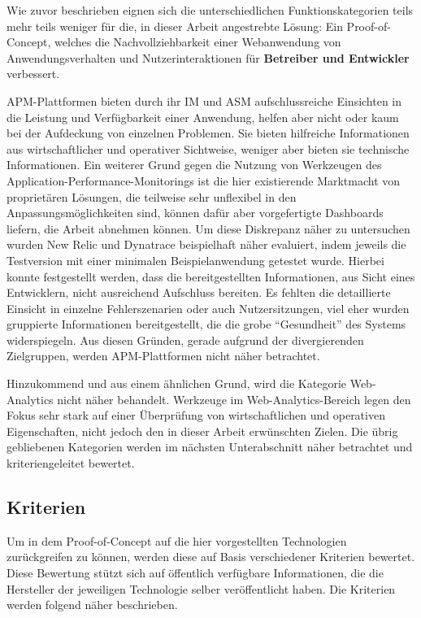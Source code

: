 Wie zuvor beschrieben eignen sich die unterschiedlichen Funktionskategorien teils mehr teils weniger für die, in dieser Arbeit angestrebte Lösung: Ein Proof-of-Concept, welches die Nachvollziehbarkeit einer Webanwendung von Anwendungsverhalten und Nutzerinteraktionen für \textbf{Betreiber und Entwickler} verbessert.

APM-Plattformen bieten durch ihr IM und ASM aufschlussreiche Einsichten in die Leistung und Verfügbarkeit einer Anwendung, helfen aber nicht oder kaum bei der Aufdeckung von einzelnen Problemen. Sie bieten hilfreiche Informationen aus wirtschaftlicher und operativer Sichtweise, weniger aber bieten sie technische Informationen. Ein weiterer Grund gegen die Nutzung von Werkzeugen des Application-Performance-Monitorings ist die hier existierende Marktmacht von proprietären Lösungen, die teilweise sehr unflexibel in den Anpassungsmöglichkeiten sind, können dafür aber vorgefertigte Dashboards liefern, die Arbeit abnehmen können. Um diese Diskrepanz näher zu untersuchen wurden New Relic und Dynatrace beispielhaft näher evaluiert, indem jeweils die Testversion mit einer minimalen Beispielanwendung getestet wurde. Hierbei konnte festgestellt werden, dass die bereitgestellten Informationen, aus Sicht eines Entwicklern, nicht ausreichend Aufschluss bereiten. Es fehlten die detaillierte Einsicht in einzelne Fehlerszenarien oder auch Nutzersitzungen, viel eher wurden gruppierte Informationen bereitgestellt, die die grobe \enquote{Gesundheit} des Systems widerspiegeln. Aus diesen Gründen, gerade aufgrund der divergierenden Zielgruppen, werden APM-Plattformen nicht näher betrachtet.

Hinzukommend und aus einem ähnlichen Grund, wird die Kategorie Web-Analytics nicht näher behandelt. Werkzeuge im Web-Analytics-Bereich legen den Fokus sehr stark auf einer Überprüfung von wirtschaftlichen und operativen Eigenschaften, nicht jedoch den in dieser Arbeit erwünschten Zielen. Die übrig gebliebenen Kategorien werden im nächsten Unterabschnitt näher betrachtet und kriteriengeleitet bewertet.

\subsection{Kriterien}

Um in dem Proof-of-Concept auf die hier vorgestellten Technologien zurückgreifen zu können, werden diese auf Basis verschiedener Kriterien bewertet. Diese Bewertung stützt sich auf öffentlich verfügbare Informationen, die die Hersteller der jeweiligen Technologie selber veröffentlicht haben. Die Kriterien werden folgend näher beschrieben.

